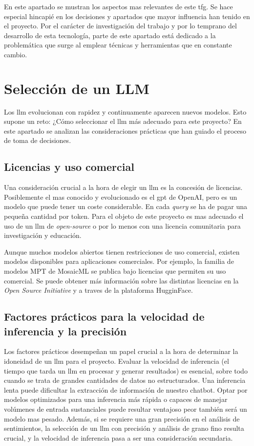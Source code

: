 
En este apartado se mustran los aspectos mas relevantes de este \acrshort{tfg}. Se hace especial hincapié en los decisiones y apartados que mayor influencia han tenido en el proyecto. Por el carácter de investigación del trabajo y por lo temprano del desarrollo de esta tecnología, parte de este apartado está dedicado a la problemática que surge al emplear técnicas y herramientas que en constante cambio.

\section{Selección de un LLM}

Los \acrfull{llm} evolucionan con rapidez y continuamente aparecen nuevos modelos. Esto supone un reto: ¿Cómo seleccionar el \acrshort{llm} más adecuado para este proyecto? En este apartado se analizan las consideraciones prácticas que han guiado el proceso de toma de decisiones.

\subsection{Licencias y uso comercial}
Una consideración crucial a la hora de elegir un \acrshort{llm} es la concesión de licencias. Posiblemente el mas conocido y evolucionado es el \acrshort{gpt} de OpenAI, pero es un modelo que puede tener un coste considerable. En cada \textit{query} se ha de pagar una pequeña cantidad  por token. Para el objeto de este proyecto es mas adecuado el uso de un \acrshort{llm} de \textit{open-source} o por lo menos con una licencia comunitaria para investigación y educación.

Aunque muchos modelos abiertos tienen restricciones de uso comercial, existen modelos disponibles para aplicaciones comerciales. Por ejemplo, la familia de modelos MPT de MosaicML se publica bajo licencias que permiten su uso comercial. Se puede obtener más información sobre las distintas licencias en la \textit{Open Source Initiative} y a traves de la plataforma HugginFace.

\subsection{Factores prácticos para la velocidad de inferencia y la precisión}
Los factores prácticos desempeñan un papel crucial a la hora de determinar la idoneidad de un \acrshort{llm} para el proyecto. Evaluar la velocidad de inferencia (el tiempo que tarda un \acrshort{llm} en procesar y generar resultados) es esencial, sobre todo cuando se trata de grandes cantidades de datos no estructurados. Una inferencia lenta puede dificultar la extracción de información de nuestro chatbot. Optar por modelos optimizados para una inferencia más rápida o capaces de manejar volúmenes de entrada sustanciales puede resultar ventajoso peor también será un modelo mas pesado. Además, si se requiere una gran precisión en el análisis de sentimientos, la selección de un \acrshort{llm} con precisión y análisis de grano fino resulta crucial, y la velocidad de inferencia pasa a ser una consideración secundaria.

